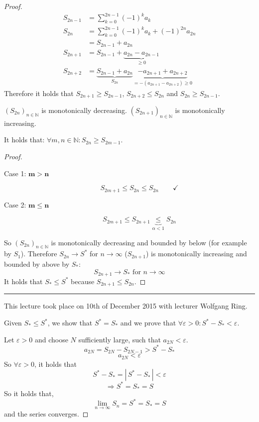 \documentclass[a4paper,landscape,twocolumn]{article}
\newcommand\seq[1]{{\left(#1\right)}_{n \in \mathbb N}}
\newcommand\card[1]{\left|\,#1\,\right|}
\newcommand\meta[3]{\hrule{} This #1 took place on #2 with lecturer #3.\par}
\begin{document}
\begin{proof}
  \begin{align*}
    S_{2n-1} &= \sum_{k=0}^{2n-1} (-1)^{k} a_k \\
    S_{2n} &= \sum_{k=0}^{2n-1} (-1)^{k} a_k + (-1)^{2n} a_{2n} \\
      &= S_{2n-1} + a_{2n} \\
    S_{2n+1} &= S_{2n-1} + \underbrace{a_{2n} - a_{2n-1}}_{\geq 0} \\
    S_{2n+2} &= \underbrace{S_{2n-1} + a_{2n}}_{S_{2n}} \underbrace{- a_{2n+1} + a_{2n+2}}_{= -(a_{2n+1} - a_{2n+2}) \geq 0}
  \end{align*}
  Therefore it holds that $S_{2n+1} \geq S_{2n-1}$, $S_{2n+2} \leq S_{2n}$ and $S_{2n} \geq S_{2n-1}$.

  $\seq{S_{2n}}$ is monotonically decreasing.
  $\seq{S_{2n+1}}$ is monotonically increasing.

  It holds that: $\forall m,n \in \mathbb N: S_{2n} \geq S_{2m - 1}$.

  \begin{proof}
    \begin{description}
      \item[Case 1: $\mathbf{m > n}$]
        \[ S_{2m+1} \leq S_{2n} \leq S_{2n} \qquad\checkmark \]
      \item[Case 2: $\mathbf{m \leq n}$]
        \[ S_{2m+1} \leq S_{2n+1} \underbrace{\leq}_{\alpha < 1} S_{2n} \]
    \end{description}
    So $\seq{S_{2n}}$ is monotonically decreasing and bounded by below (for example by $S_1$).
    Therefore $S_{2n} \rightarrow S^*$ for $n \rightarrow \infty$ ($S_{2n+1}$) is monotonically increasing
    and bounded by above by $S_*$:
    \[ S_{2n+1} \rightarrow S_* \text{ for } n \to \infty \]
    It holds that $S_* \leq S^*$ because $S_{2n+1} \leq S_{2n}$.
  \end{proof}

  \meta{lecture}{10th of December 2015}{Wolfgang Ring}

  Given $S_* \leq S^*$, we show that $S^* = S_*$ and we prove that $\forall \varepsilon > 0: S^* - S_* < \varepsilon$.

  Let $\varepsilon > 0$ and choose $N$ sufficiently large, such that $a_{2N} < \varepsilon$.
  \[ a_{2N} = S_{2N} - S_{2N-1} > S^* - S_* \]
  \[ a_{2N} < \varepsilon \]
  So $\forall \varepsilon > 0$, it holds that
  \[ S^* - S_* = \card{S^* - S_*} < \varepsilon \]
  \[ \Rightarrow S^* = S_* = S \]
  So it holds that,
  \[ \lim_{n\to\infty} S_n = S^* = S_* = S \]
  and the series converges.
\end{proof}
\end{document}
